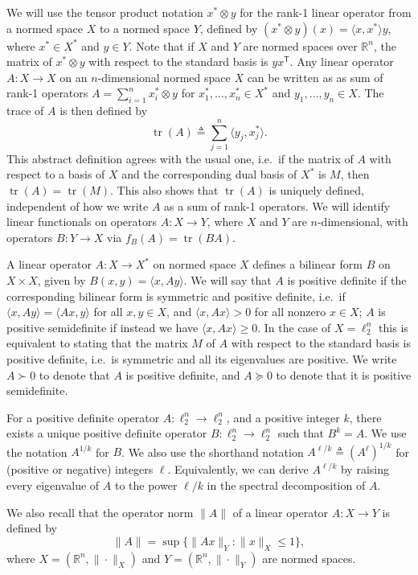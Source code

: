 \documentclass[11pt]{article}
\newcommand{\R}{{\mathbb{R}}}
\newcommand{\T}{\mathsf T}
\newcommand{\eqdef}{\triangleq}
\DeclareMathOperator{\tr}{tr}
\begin{document}
We will use the tensor product notation $x^* \otimes y$ for the rank-1
linear operator from a normed space $X$ to a normed space $Y$, defined
by $(x^* \otimes y)(x) = \langle x, x^*\rangle y$, where $x^* \in X^*$
and $y \in Y$. Note that if $X$ and $Y$ are normed spaces over $\R^n$,
the matrix of $x^* \otimes y$ with respect to the standard basis is
$yx^\T$. Any linear operator $A:X \to X$ on an $n$-dimensional normed
space $X$ can be written as as sum of rank-1 operators $A = \sum_{i =
  1}^n{x^*_i \otimes y}$ for $x_1^*, \ldots, x_n^* \in X^*$ and $y_1,
\ldots, y_n \in X$. The trace of $A$ is then defined by
\[
\tr(A) \eqdef \sum_{j = 1}^n{\langle y_j, x^*_j \rangle}.
\]
This abstract definition agrees with the usual one, i.e.~if the matrix
of $A$ with respect to a basis of $X$ and the corresponding dual basis
of $X^*$ is $M$, then $\tr(A) = \tr(M)$. This also shows that $\tr(A)$
is uniquely defined, independent of how we write $A$ as a sum of
rank-1 operators. We will identify linear functionals on operators
$A:X \to Y$, where $X$ and $Y$ are $n$-dimensional, with operators
$B:Y \to X$ via $f_B(A) = \tr(BA)$.

A linear operator $A: X \to X^*$ on normed space $X$ defines a
bilinear form $B$ on $X \times X$, given by $B(x,y) = \langle x, Ay
\rangle$. We will say that $A$ is positive definite if the
corresponding bilinear form is symmetric and positive definite,
i.e.~if $\langle x, Ay \rangle = \langle Ax, y\rangle$ for all $x,y
\in X$, and $\langle x, Ax \rangle >0$ for all nonzero $x \in X$; $A$
is positive semidefinite if instead we have $\langle x, Ax \rangle \ge
0.$ In the case of $X = \ell_2^n$ this is equivalent to stating that
the matrix $M$ of $A$ with respect to the standard basis is positive
definite, i.e.~is symmetric and all its eigenvalues are positive. We
write $A \succ 0$ to denote that $A$ is positive definite, and $A
\succeq 0$ to denote that it is positive semidefinite.

For a positive definite operator $A:\ell_2^n \to \ell_2^n$, and a
positive integer $k$, there exists a unique positive definite operator
$B:\ell_2^n \to \ell_2^n$ such that $B^k = A$. We use the notation
$A^{1/k}$ for $B$. We also use the shorthand notation $A^{\ell/k} \eqdef
(A^\ell)^{1/k}$ for (positive or negative) integers
$\ell$. Equivalently, we can derive $A^{\ell/k}$ by raising every
eigenvalue of $A$ to the power $\ell/k$ in the spectral decomposition
of $A$.

We also recall that the operator norm $\|A\|$ of a linear operator
$A:X \to Y$ is defined by 
\[
\|A\| = \sup\{\|Ax\|_Y: \|x\|_X \le 1\},
\]
where $X = (\R^n, \|\cdot\|_X)$ and $Y = (\R^n, \|\cdot\|_Y)$ are
normed spaces. 
\end{document}
